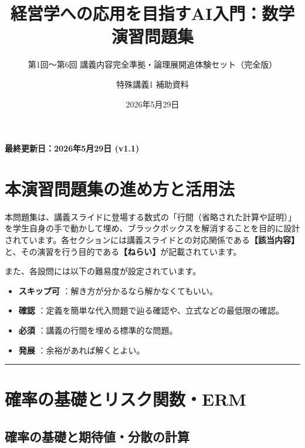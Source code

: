 \documentclass[
  pandoc]{bxjsarticle}
\title{経営学への応用を目指すAI入門：数学演習問題集}
\subtitle{第1回〜第6回 講義内容完全準拠・論理展開追体験セット（完全版）}
\author{特殊講義1 補助資料}
\date{2026年5月29日}
\providecommand{\tightlist}{%
  \setlength{\itemsep}{0pt}\setlength{\parskip}{0pt}}
\begin{document}
\maketitle

\begin{flushright}
\textbf{最終更新日：2026年5月29日 (v1.1)}
\end{flushright}

\section*{本演習問題集の進め方と活用法}\label{ux672cux6f14ux7fd2ux554fux984cux96c6ux306eux9032ux3081ux65b9ux3068ux6d3bux7528ux6cd5}

本問題集は、講義スライドに登場する数式の「行間（省略された計算や証明）」を学生自身の手で動かして埋め、ブラックボックスを解消することを目的に設計されています。各セクションには講義スライドとの対応関係である\textbf{【該当内容】}と、その演習を行う目的である\textbf{【ねらい】}が記載されています。

また、各設問には以下の難易度が設定されています。

\begin{itemize}
\tightlist
\item
  \textbf{スキップ可} ：解き方が分かるなら解かなくてもいい。
\item
  \textbf{確認}
  ：定義を簡単な代入問題で辿る確認や、立式などの最低限の確認。
\item
  \textbf{必須} ：講義の行間を埋める標準的な問題。
\item
  \textbf{発展} ：余裕があれば解くとよい。
\end{itemize}

\begin{center}\rule{0.5\linewidth}{0.5pt}\end{center}

\section{確率の基礎とリスク関数・ERM}\label{ux78baux7387ux306eux57faux790eux3068ux30eaux30b9ux30afux95a2ux6570erm}

\subsection{確率の基礎と期待値・分散の計算}\label{ux78baux7387ux306eux57faux790eux3068ux671fux5f85ux5024ux5206ux6563ux306eux8a08ux7b97}
\end{document}
